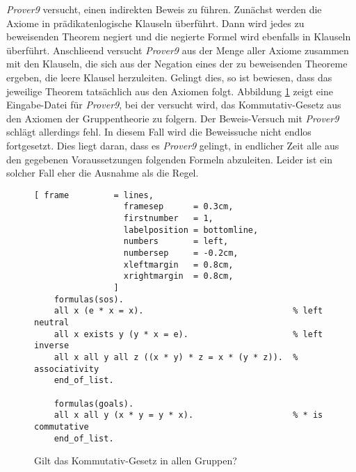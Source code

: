\textsl{Prover9} versucht, einen indirekten Beweis zu f\"{u}hren.  Zun\"{a}chst werden die Axiome in
pr\"{a}dikatenlogische Klauseln 
\"{u}berf\"{u}hrt. Dann wird jedes zu beweisenden Theorem negiert und die negierte Formel wird ebenfalls in 
Klauseln \"{u}berf\"{u}hrt.  Anschlie\3end versucht \textsl{Prover9} aus der Menge aller Axiome zusammen mit den
Klauseln, die sich aus der Negation eines der zu beweisenden Theoreme ergeben, die leere
Klausel herzuleiten.  Gelingt dies, so ist bewiesen, dass das jeweilige  Theorem tats\"{a}chlich aus den Axiomen
folgt.   Abbildung \ref{fig:group-commutative.in} zeigt eine
Eingabe-Datei f\"{u}r \textsl{Prover9}, bei der versucht wird, das Kommutativ-Gesetz aus den Axiomen der
Gruppentheorie zu folgern.  Der Beweis-Versuch mit \textsl{Prover9} schl\"{a}gt allerdings fehl.  In diesem Fall
wird die Beweissuche nicht endlos fortgesetzt.  Dies liegt daran, dass es \textsl{Prover9} gelingt, in
endlicher Zeit alle aus den gegebenen Voraussetzungen folgenden Formeln abzuleiten.
Leider ist ein solcher Fall eher die Ausnahme als die Regel.

\begin{figure}[!ht]
\centering
\begin{Verbatim}[ frame         = lines, 
                  framesep      = 0.3cm, 
                  firstnumber   = 1,
                  labelposition = bottomline,
                  numbers       = left,
                  numbersep     = -0.2cm,
                  xleftmargin   = 0.8cm,
                  xrightmargin  = 0.8cm,
                ]
    formulas(sos).
    all x (e * x = x).                              % left neutral 
    all x exists y (y * x = e).                     % left inverse
    all x all y all z ((x * y) * z = x * (y * z)).  % associativity
    end_of_list.
    
    formulas(goals).
    all x all y (x * y = y * x).                    % * is commutative
    end_of_list.
\end{Verbatim}
\vspace*{-0.3cm}
\caption{Gilt das Kommutativ-Gesetz in allen Gruppen?}
\label{fig:group-commutative.in}
\end{figure}


